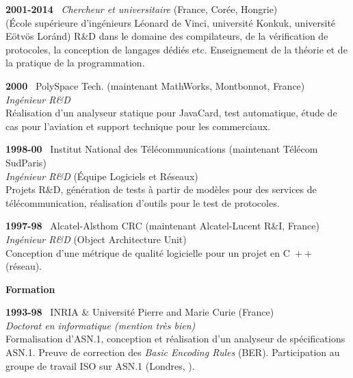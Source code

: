 \documentclass[a4paper,11pt]{article}
\newcommand{\cpp}{\mbox{C \hspace*{-2.5mm} \raise 0.7mm \hbox{${\scriptscriptstyle ++}$}}}
\begin{document}
\bigskip

\noindent\textbf{2001-2014} \ \textsf{\emph{Chercheur et
  universitaire}} (France, Corée, Hongrie)\\ (\textsf{École supérieure
  d'ingénieurs Léonard de Vinci}, \textsf{université Konkuk},
\textsf{université E\"otv\"os Lor\'and}) R\&D dans le domaine des
compilateurs, de la vérification de protocoles, la conception de
langages dédiés etc. Enseignement de la théorie et de la pratique de
la programmation.

\bigskip

\noindent\textbf{2000} \ \textsf{PolySpace Tech.\@} (maintenant
MathWorks, Montbonnot, France)\\ \emph{Ingénieur R\&D}\\ Réalisation
d'un analyseur statique pour JavaCard, test automatique, étude de cas
pour l'aviation et support technique pour les commerciaux.

\bigskip

\noindent\textbf{1998-00} \ \textsf{Institut National des
  Télécommunications} (maintenant Télécom
SudParis)\\ \emph{Ingénieur R\&D} (Équipe Logiciels et
Réseaux)\\ Projets R\&D, génération de tests à partir de modèles pour
des services de télécommunication, réalisation d'outils pour le test
de protocoles.

\bigskip

\noindent\textbf{1997-98} \ \textsf{Alcatel-Alsthom CRC} (maintenant
Alcatel-Lucent R\&I, France)\\ \emph{Ingénieur R\&D} (Object
Architecture Unit)\\ Conception d'une métrique de qualité logicielle
pour un projet en \cpp{} (réseau).

\bigskip
\noindent\textbf{\large Formation}
\bigskip

\noindent\textbf{1993-98} \ \textsf{INRIA \& Université Pierre and
  Marie Curie} (France)\\ \emph{Doctorat en informatique (mention très
bien)}\\ Formalisation d'ASN.1, conception et réalisation d'un
analyseur de spécifications ASN.1. Preuve de correction des
\emph{Basic Encoding Rules} (BER). Participation au groupe de travail
ISO sur ASN.1 (Londres, ).


\newpage

\end{document}
